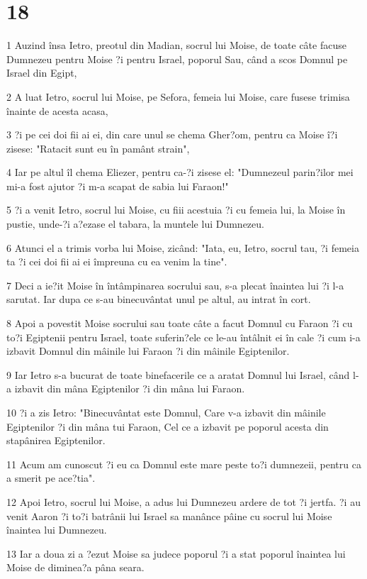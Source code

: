 \chapter{18}

\par 1 Auzind însa Ietro, preotul din Madian, socrul lui Moise, de toate câte facuse Dumnezeu pentru Moise ?i pentru Israel, poporul Sau, când a scos Domnul pe Israel din Egipt,
\par 2 A luat Ietro, socrul lui Moise, pe Sefora, femeia lui Moise, care fusese trimisa înainte de acesta acasa,
\par 3 ?i pe cei doi fii ai ei, din care unul se chema Gher?om, pentru ca Moise î?i zisese: "Ratacit sunt eu în pamânt strain",
\par 4 Iar pe altul îl chema Eliezer, pentru ca-?i zisese el: "Dumnezeul parin?ilor mei mi-a fost ajutor ?i m-a scapat de sabia lui Faraon!"
\par 5 ?i a venit Ietro, socrul lui Moise, cu fiii acestuia ?i cu femeia lui, la Moise în pustie, unde-?i a?ezase el tabara, la muntele lui Dumnezeu.
\par 6 Atunci el a trimis vorba lui Moise, zicând: "Iata, eu, Ietro, socrul tau, ?i femeia ta ?i cei doi fii ai ei împreuna cu ea venim la tine".
\par 7 Deci a ie?it Moise în întâmpinarea socrului sau, s-a plecat înaintea lui ?i l-a sarutat. Iar dupa ce s-au binecuvântat unul pe altul, au intrat în cort.
\par 8 Apoi a povestit Moise socrului sau toate câte a facut Domnul cu Faraon ?i cu to?i Egiptenii pentru Israel, toate suferin?ele ce le-au întâlnit ei în cale ?i cum i-a izbavit Domnul din mâinile lui Faraon ?i din mâinile Egiptenilor.
\par 9 Iar Ietro s-a bucurat de toate binefacerile ce a aratat Domnul lui Israel, când l-a izbavit din mâna Egiptenilor ?i din mâna lui Faraon.
\par 10 ?i a zis Ietro: "Binecuvântat este Domnul, Care v-a izbavit din mâinile Egiptenilor ?i din mâna tui Faraon, Cel ce a izbavit pe poporul acesta din stapânirea Egiptenilor.
\par 11 Acum am cunoscut ?i eu ca Domnul este mare peste to?i dumnezeii, pentru ca a smerit pe ace?tia".
\par 12 Apoi Ietro, socrul lui Moise, a adus lui Dumnezeu ardere de tot ?i jertfa. ?i au venit Aaron ?i to?i batrânii lui Israel sa manânce pâine cu socrul lui Moise înaintea lui Dumnezeu.
\par 13 Iar a doua zi a ?ezut Moise sa judece poporul ?i a stat poporul înaintea lui Moise de diminea?a pâna seara.
